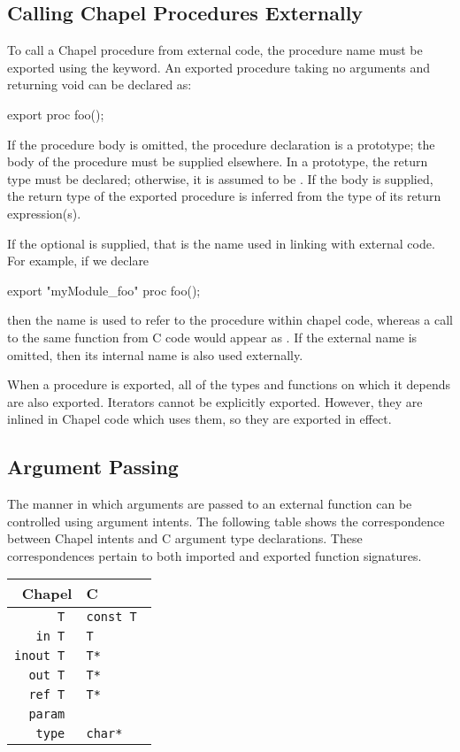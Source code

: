 \subsection{Calling Chapel Procedures Externally}
\label{Calling_Chapel_Procedures_Externally}

To call a Chapel procedure from external code, the procedure name must be
exported using the  keyword.  An exported procedure taking no
arguments and returning void can be declared as:
\begin{chapel}
export proc foo();
\end{chapel}
If the procedure body is omitted, the procedure declaration is a prototype; the
body of the procedure must be supplied elsewhere.  In a prototype, the return
type must be declared; otherwise, it is assumed to be .  If the body
is supplied, the return type of the exported procedure is inferred from the
type of its return expression(s).  

If the optional  is supplied, that is the name used in
linking with external code.  For example, if we declare
\begin{chapel}
export "myModule_foo" proc foo();
\end{chapel}
\noindent
then the name  is used to refer to the procedure within chapel code,
whereas a call to the same function from C code would appear
as .  If the external name is omitted, then its internal
name is also used externally.

When a procedure is exported, all of the types and functions on which it depends
are also exported.  Iterators cannot be explicitly exported.  However, they are
inlined in Chapel code which uses them, so they are exported in effect.

\subsection{Argument Passing}
\label{Interop_Argument_Passing}

The manner in which arguments are passed to an external function can be
controlled using argument intents.  The following table shows the correspondence
between Chapel intents and C argument type declarations.  These correspondences
pertain to both imported and exported function signatures.

\begin{tabular}{rl}
Chapel & C \\
\hline
\tt T & \tt const T \\
\tt in T & \tt T \\
\tt inout T & \tt T* \\
\tt out T & \tt T* \\
\tt ref T & \tt T* \\
\tt param & \tt \\
\tt type & \tt char*\\
\end{tabular}

